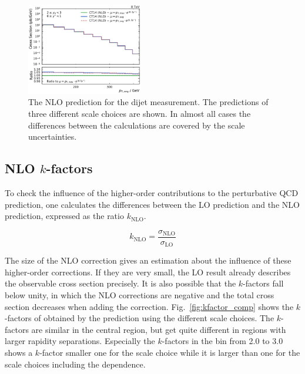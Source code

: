 \begin{figure}[htp]
    \includegraphics[width=0.45\textwidth]{figures/theory/nlo_xs_comp_yb2ys0.pdf}
    \caption{The NLO prediction \NLOJETPP for the dijet measurement. The
    predictions of three different scale choices are shown. In almost all cases
    the differences between the calculations are covered by the scale uncertainties.}
    \label{fig:xs_nlo_comp}
\end{figure}


\subsection{NLO $k$-factors}

To check the influence of the higher-order contributions to the perturbative QCD
prediction, one calculates the differences between the LO prediction and the NLO
prediction, expressed as the ratio $k_\mathrm{NLO}$.

\begin{equation*}
    k_{\mathrm{NLO}} = \frac{\sigma_{\mathrm{NLO}}}{\sigma_{\mathrm{LO}}}
\end{equation*}

The size of the NLO correction gives an estimation about the influence of these
higher-order corrections. If they are very small, the LO result already
describes the observable cross section precisely. It is also possible that the
$k$-factors fall below unity, in which the NLO corrections are negative and the
total cross section decreases when adding the correction.
Fig.~\ref{fig:kfactor_comp} shows the $k$-factors of obtained by the prediction
using the different scale choices. The $k$-factors are similar in the central
region, but get quite different in regions with larger rapidity separations.
Especially the $k$-factors in the \ystar bin from 2.0 to 3.0 shows a $k$-factor
smaller one for the \ptavg scale choice while it is larger than one for the
scale choices including the \ystar dependence.


